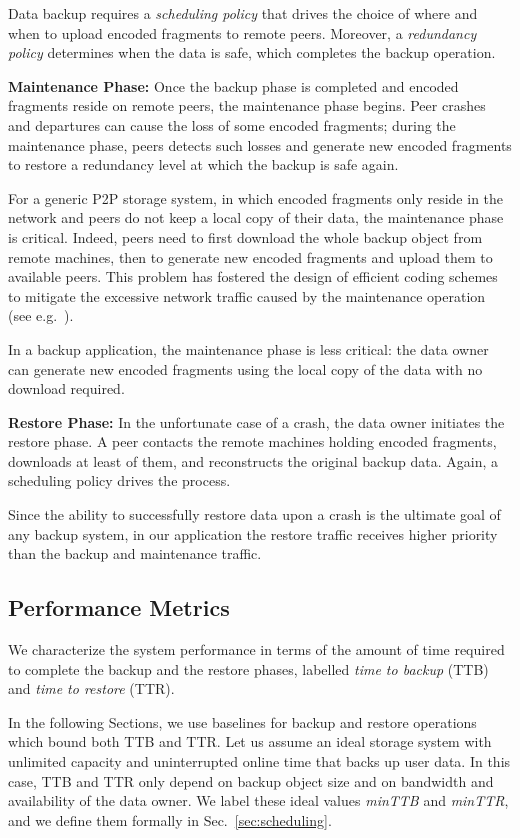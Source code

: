 \documentclass[conference,10pt]{IEEEtran}
\begin{document}
Data backup requires a \emph{scheduling policy} that drives the choice
of where and when to upload encoded fragments to remote
peers. Moreover, a \emph{redundancy policy} determines when the data is safe, which completes the backup operation.


\noindent \textbf{Maintenance Phase:} Once the backup phase is
completed and encoded fragments reside on remote peers, the
maintenance phase begins. Peer crashes and departures can cause the
loss of some encoded fragments; during the maintenance phase, peers
detects such losses and generate new encoded fragments to restore a
redundancy level at which the backup is safe again.

For a generic P2P storage system, in which encoded fragments only
reside in the network and peers do not keep a local copy of their
data, the maintenance phase is critical. Indeed, peers need to first
download the whole backup object from remote machines, then to
generate new encoded fragments and upload them to available
peers. This problem has fostered the design of efficient coding
schemes to mitigate the excessive network traffic caused by the
maintenance operation (see
e.g.~\cite{dimakis07,duminuco-biersack-08}).

In a backup application, the maintenance phase is less critical: the
data owner can generate new encoded fragments using the local copy of
the data with no download required.

\noindent \textbf{Restore Phase: } In the unfortunate case of a
crash, the data owner initiates the restore phase. A peer contacts the
remote machines holding encoded fragments, downloads at least  of
them, and reconstructs the original backup data. Again, a scheduling
policy drives the process.

Since the ability to successfully restore data upon a crash is the
ultimate goal of any backup system, in our application the restore
traffic receives higher priority than the backup and maintenance
traffic.

\subsection{Performance Metrics}

We characterize the system performance in terms of the amount of time
required to complete the backup and the restore phases,
labelled \emph{time to backup} (TTB) and \emph{time to restore}
(TTR). 

In the following Sections, we use baselines for backup and restore
operations which bound both TTB and TTR. Let us assume an ideal
storage system with unlimited capacity and uninterrupted online time
that backs up user data. In this case, TTB and TTR only depend on
backup object size and on bandwidth and availability of the data
owner. We label these ideal values \emph{minTTB} and \emph{minTTR},
and we define them formally in Sec.~\ref{sec:scheduling}.
\end{document}

